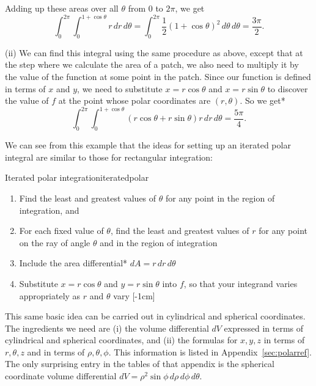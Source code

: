 \documentclass[svgnames]{report}
\begin{document}
\begin{solution}
      Adding up these areas over all $\theta$ from $0$ to $2\pi$, we
      get
      \[
        \int_0^{2\pi} \int_0^{1+\cos \theta} r \, dr \, d\theta =
                \int_0^{2\pi}\frac{1}{2}(1+\cos \theta)^2 \, d\theta \,
                d\theta  =  \boxed{\frac{3\pi}{2}}. 
              \]
              
              
    (ii) We can find this integral using the same procedure as above,
    except that at the step where we calculate the area of a patch, we
    also need to multiply it by the value of the function at some point
    in the patch. Since our function is defined in terms of $x$ and
    $y$, we need to substitute $x = r\cos \theta$ and $x = r\sin
    \theta$ to discover the value of $f$ at the point whose polar
    coordinates are $(r,\theta)$. So we get*
    \[
      \int_0^{2\pi} \int_0^{1+\cos \theta} (r \cos\theta + r\sin
      \theta)r \, dr \, d\theta = \boxed{\frac{5\pi}{4}}. 
    \]
\end{solution}

We can see from this example that the ideas for setting up an iterated
polar integral are similar to those for 
rectangular integration:
\begin{obs}{Iterated polar integration}{iteratedpolar}
\begin{enumerate}[itemsep = 6pt, topsep = 5pt, leftmargin=12pt]
\item Find the least and greatest values of $\theta$ for any point in
  the region of integration, and 
\item For each fixed value of $\theta$, find the least and greatest
  values of $r$ for any point on the ray of angle $\theta$ and in the
  region of integration
\item Include the area differential* $dA = r \, dr \, d\theta$
\item Substitute $x = r \cos\theta$ and $y=r\sin \theta$ into $f$, so
  that your integrand varies appropriately as $r$ and $\theta$ vary 
  [-1cm]
\end{enumerate}
\end{obs}

This same basic idea can be carried out in cylindrical and spherical
coordinates. The ingredients we need are (i) the volume differential
$dV$ expressed in terms of cylindrical and spherical coordinates, and
(ii) the formulas for $x, y, z$ in terms of $r, \theta, z$ and in
terms of $\rho, \theta, \phi$. This information is listed in
Appendix~\ref{sec:polarref}. The only surprising entry in the tables
of that appendix is the spherical coordinate volume differential $dV =
\rho^2 \sin \phi \, d\rho \, d \phi \, d\theta$.
\end{document}
